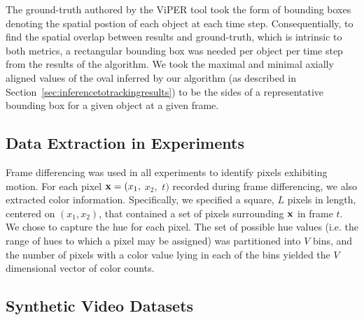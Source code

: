 \documentclass[twocolumn, final]{svjour3}
\begin{document}
The ground-truth authored by the ViPER tool took the form of bounding boxes denoting the spatial postion of each object at each time step. Consequentially, to find the spatial overlap between results and ground-truth, which is intrinsic to both metrics, a rectangular bounding box was needed per object per time step from the results of the algorithm. We took the maximal and minimal axially aligned values of the oval inferred by our algorithm (as described in Section~\ref{sec:inferencetotrackingresults}) to be the sides of a representative bounding box for a given object at a given frame.



\subsection{Data Extraction in Experiments}
\label{sec:dataextractioninexperiments}

Frame differencing was used in all experiments to identify pixels exhibiting motion. 
For each pixel $\bold{x} = ( x_{1},$ $x_{2},$ $t )$ recorded during frame differencing, we also extracted color information. Specifically, we specified a square, $L$ pixels in length, centered on $(x_{1}, x_{2})$, that contained a set of pixels surrounding $\bold{x}$ in frame $t$. We chose to capture the hue for each pixel. The set of possible hue values (i.e. the range of hues to which a pixel may be assigned) was partitioned into $V$ bins, and the number of pixels with a color value lying in each of the bins yielded the $V$ dimensional vector of color counts.



\subsection{Synthetic Video Datasets}
\label{sec:syntheticvideodatasets}
\end{document}
